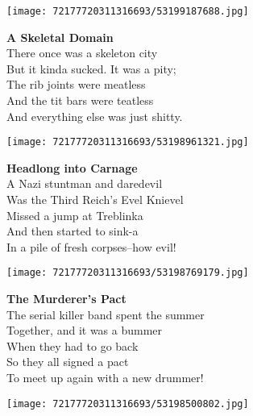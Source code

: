\documentclass[10pt,letterpaper]{article}
\begin{document}
\begin{center}
\texttt{[image: 72177720311316693/53199187688.jpg]}
\end{center}

\begin{center}
\textbf{A Skeletal Domain}\\
\vskip 0.2in
There once was a skeleton city\\
But it kinda sucked.  It was a pity;\\
The rib joints were meatless\\
And the tit bars were teatless\\
And everything else was just shitty.\\
\end{center}
\pagebreak

\begin{center}\texttt{[image: 72177720311316693/53198961321.jpg]}
\end{center}
\begin{center}
\textbf{Headlong into Carnage}\\
\vskip 0.2in
A Nazi stuntman and daredevil\\
Was the Third Reich's Evel Knievel\\
Missed a jump at Treblinka\\
And then started to sink-a\\
In a pile of fresh corpses--how evil!\\
\end{center}
\pagebreak

\begin{center}\texttt{[image: 72177720311316693/53198769179.jpg]}
\end{center}
\begin{center}
\textbf{The Murderer's Pact}\\
\vskip 0.2in
The serial killer band spent the summer\\
Together, and it was a bummer\\
When they had to go back\\
So they all signed a pact\\
To meet up again with a new drummer!\\
\end{center}
\pagebreak

\begin{center}
\texttt{[image: 72177720311316693/53198500802.jpg]}
\end{center}
\end{document}
